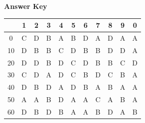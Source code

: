 \documentclass[11pt,a4paper]{article}
\begin{document}
\textbf{Answer Key}
\begin{tabular}{ | c | c c c c c c c c c c | }
\hline
 & 1 & 2 & 3 & 4 & 5 & 6 & 7 & 8 & 9 & 0 \\
\hline
0 & C & D & B & A & B & D & A & D & A & A \\
10 & D & B & B & C & D & B & B & D & D & A \\
20 & D & D & B & D & C & D & B & B & C & D \\
30 & C & D & A & D & C & B & D & C & B & A \\
40 & D & B & D & A & D & B & A & B & A & A \\
50 & A & A & B & D & A & A & C & A & B & A \\
60 & D & B & D & B & A & A & B & D & A & B \\
\hline
\end{tabular}
\clearpage
\end{document}
